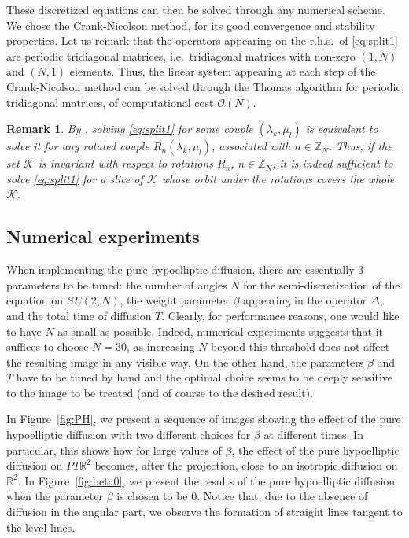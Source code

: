 \documentclass[proc]{edpsmath}
\newtheorem{remark}[theorem]{Remark}
\begin{document}
These discretized equations can then be solved through any numerical scheme.
We chose the Crank-Nicolson method, for its good convergence and stability properties.
Let us remark that the operators appearing on the r.h.s.\ of \eqref{eq:split1} are periodic tridiagonal matrices, i.e.\ tridiagonal matrices with non-zero $(1,N)$ and $(N,1)$ elements.
Thus, the linear system appearing at each step of the Crank-Nicolson method can be solved through the Thomas algorithm for periodic tridiagonal matrices, of computational cost $\mathcal{O}(N)$.

\begin{remark}
  \label{rmk:simmetry}
  By \cite[Theorem~2]{Remizov2013}, solving \eqref{eq:split1} for some couple $(\lambda_k,\mu_l)$ is equivalent to solve it for any rotated couple $R_n(\lambda_k,\mu_l)$, associated with $n\in\mathbb Z_N$.
  Thus, if the set $\mathcal K$ is invariant with respect to rotations $R_{n}$, $n\in \mathbb Z_N$, it is indeed sufficient to solve \eqref{eq:split1} for a slice of $\mathcal K$ whose orbit under the rotations covers the whole $\mathcal K$.
\end{remark}


\subsection{Numerical experiments}

When implementing the pure hypoelliptic diffusion, there are essentially 3 parameters to be tuned: the number of angles $N$ for the semi-discretization of the equation on $SE(2,N)$, the weight parameter $\beta$ appearing in the operator $\Delta$, and the total time of diffusion $T$.
Clearly, for performance reasons, one would like to have $N$ as small as possible. Indeed, numerical experiments suggests that it suffices to choose $N=30$, as increasing $N$ beyond this threshold does not affect the resulting image in any visible way. On the other hand, the parameters $\beta$ and $T$ have to be tuned by hand and the optimal choice seems to be deeply sensitive to the image to be treated (and of course to the desired result).

In Figure~\ref{fig:PH}, we present a sequence of images showing the effect of the pure hypoelliptic diffusion with two different choices for $\beta$ at different times.
In particular, this shows how for large values of $\beta$, the effect of the pure hypoelliptic diffusion on $PT\mathbb R^2$ becomes, after the projection, close to an isotropic diffusion on $\mathbb R^2$.
In Figure~\ref{fig:beta0}, we present the results of the pure hypoelliptic diffusion when the parameter $\beta$ is chosen to be $0$. Notice that, due to the absence of diffusion in the angular part, we observe the formation of straight lines tangent to the level lines.
\end{document}
